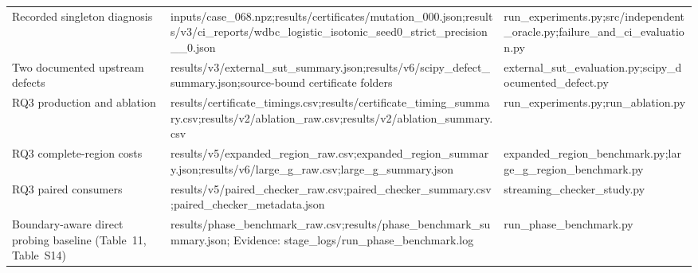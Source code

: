 \documentclass[11pt,a4paper]{article}
\theoremstyle{plain}
\theoremstyle{definition}
\theoremstyle{remark}
\begin{document}
\begin{table}[!htbp]
\begin{tabularx}{\textwidth}{@{} >{\raggedright\arraybackslash}p{3.2cm} >{\raggedright\arraybackslash}X >{\raggedright\arraybackslash}p{3.6cm} @{}}
Recorded singleton diagnosis & inputs/\allowbreak case\_\allowbreak 068.npz;\allowbreak  results/\allowbreak certificates/\allowbreak mutation\_\allowbreak 000.json;\allowbreak  results/\allowbreak v3/\allowbreak ci\_\allowbreak reports/\allowbreak wdbc\_\allowbreak logistic\_\allowbreak isotonic\_\allowbreak seed0\_\allowbreak strict\_\allowbreak precision\_\allowbreak {grid,complete}\_\allowbreak 0.json & run\_\allowbreak experiments.py;\allowbreak  src/\allowbreak independent\_\allowbreak oracle.py;\allowbreak  failure\_\allowbreak and\_\allowbreak ci\_\allowbreak evaluation.py \\
Two documented upstream defects & results/\allowbreak v3/\allowbreak external\_\allowbreak sut\_\allowbreak summary.json;\allowbreak  results/\allowbreak v6/\allowbreak scipy\_\allowbreak defect\_\allowbreak summary.json;\allowbreak  source-bound certificate folders & external\_\allowbreak sut\_\allowbreak evaluation.py;\allowbreak  scipy\_\allowbreak documented\_\allowbreak defect.py \\
RQ3 production and ablation & results/\allowbreak certificate\_\allowbreak timings.csv;\allowbreak  results/\allowbreak certificate\_\allowbreak timing\_\allowbreak summary.csv;\allowbreak  results/\allowbreak v2/\allowbreak ablation\_\allowbreak raw.csv;\allowbreak  results/\allowbreak v2/\allowbreak ablation\_\allowbreak summary.csv & run\_\allowbreak experiments.py;\allowbreak  run\_\allowbreak ablation.py \\
RQ3 complete-region costs & results/\allowbreak v5/\allowbreak expanded\_\allowbreak region\_\allowbreak raw.csv;\allowbreak  expanded\_\allowbreak region\_\allowbreak summary.json;\allowbreak  results/\allowbreak v6/\allowbreak large\_\allowbreak g\_\allowbreak raw.csv;\allowbreak  large\_\allowbreak g\_\allowbreak summary.json & expanded\_\allowbreak region\_\allowbreak benchmark.py;\allowbreak  large\_\allowbreak g\_\allowbreak region\_\allowbreak benchmark.py \\
RQ3 paired consumers & results/\allowbreak v5/\allowbreak paired\_\allowbreak checker\_\allowbreak raw.csv;\allowbreak  paired\_\allowbreak checker\_\allowbreak summary.csv;\allowbreak  paired\_\allowbreak checker\_\allowbreak metadata.json & streaming\_\allowbreak checker\_\allowbreak study.py \\
Boundary-aware direct probing baseline (Table~11, Table~S14) & results/\allowbreak phase\_benchmark\_raw.csv;\allowbreak  results/\allowbreak phase\_benchmark\_summary.json; Evidence: stage\_logs/\allowbreak run\_phase\_benchmark.log & run\_\allowbreak phase\_\allowbreak benchmark.py \\

\end{tabularx}
\end{table}
\end{document}
